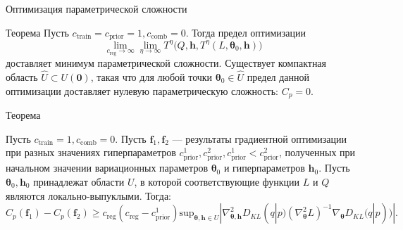 \documentclass[usenames,dvipsnames,11pt,pdf,utf8,russian,aspectratio=43]{beamer}
\begin{document}
\begin{frame}{Оптимизация параметрической сложности}
\small
%
\begin{block}{Теорема}
Пусть $c_{\text{train}} = c_{\text{prior}} = 1, c_{\text{comb}} = 0$.
Тогда предел оптимизации
\[
\lim_{c_\text{reg} \to \infty} \lim_{\eta \to \infty}   T^\eta\bigl(Q, \mathbf{h}, T^\eta(L, \boldsymbol{\theta}_0, \mathbf{h})\bigr)
\]  
доставляет минимум параметрической сложности. 
Существует компактная область $\hat{U} \subset  U(\mathbf{0})$, такая что для любой точки $\boldsymbol{\theta}_0 \in \hat{U}$ предел данной оптимизации доставляет нулевую параметрическую сложность: $C_p = 0$.
\end{block}





\begin{block}{Теорема}

Пусть $c_{\text{train}} = 1, c_{\text{comb}} = 0$.
Пусть  $\mathbf{f}_1, \mathbf{f}_2$ --- результаты градиентной оптимизации при разных значениях гиперпараметров $c_{\text{prior}}^1,c_{\text{prior}}^2, c_{\text{prior}}^1<c_{\text{prior}}^2$, полученных при начальном значении вариационных параметров $\boldsymbol{\theta}_0$ и гиперпараметров $\mathbf{h}_0$.
Пусть $\boldsymbol{\theta}_0, \mathbf{h}_0$ принадлежат области  $U$, в которой соответствующие функции $L$ и $Q$ являются локально-выпуклыми.
Тогда:
\[
    C_p(\mathbf{f}_1) - C_p(\mathbf{f}_2)  \geq c_\text{reg}(c_\text{reg} - c_\text{prior}^1)\text{sup}_{\boldsymbol{\theta}, \mathbf{h} \in U}|\nabla^2_{\boldsymbol{\theta}, \mathbf{h}} D_{KL}(q|p) (\nabla^2_{\boldsymbol{\theta}} L)^{-1}   \nabla_{\boldsymbol{\theta}} D_{KL}(q|p))|.
\]
\end{block}
\end{frame}
\end{document}
